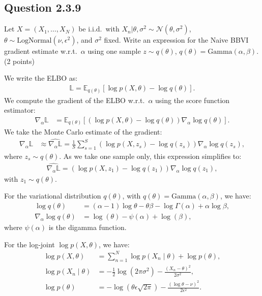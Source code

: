\documentclass{article}
\begin{document}
\begin{multicols}{2}
\subsection*{Question 2.3.9}
Let \(X = (X_1, \dots, X_N)\) be i.i.d.\ with \(X_n | \theta, \sigma^2 \sim \mathcal{N}(\theta, \sigma^2)\), \(\theta \sim \text{LogNormal}(\nu, \epsilon^2)\), and \(\sigma^2\) fixed. Write an expression for the Naive BBVI gradient estimate w.r.t.\ \(\alpha\) using one sample \(z \sim q(\theta)\), \(q(\theta) = \text{Gamma}(\alpha, \beta)\). (2 points)\bigskip 

We write the ELBO as:
\begin{align*}
    \mathbb{L} = \mathbb{E}_{q(\theta)}\left[\log p(X, \theta) - \log q(\theta)\right].
\end{align*}
We compute the gradient of the ELBO w.r.t.\ \(\alpha\) using the score function estimator:
\begin{align*}
    \nabla_\alpha \mathbb{L} &= \mathbb{E}_{q(\theta)}\left[(\log p(X, \theta) - \log q(\theta)) \nabla_\alpha \log q(\theta) \right].
\end{align*}
We take the Monte Carlo estimate of the gradient:
\begin{align*}
    \nabla_\alpha \mathbb{L} &\approx \widehat{\nabla_\alpha \mathbb{L}} = \frac{1}{S}\sum_{s=1}^{S}(\log p(X, z_s) - \log q(z_s)) \nabla_\alpha \log q(z_s),
\end{align*}
where \(z_s \sim q(\theta)\). As we take one sample only, this expression simplifies to:
\begin{align*}
    \widehat{\nabla_\alpha \mathbb{L}} = (\log p(X, z_1) - \log q(z_1)) \nabla_\alpha \log q(z_1),
\end{align*}
with \(z_1 \sim q(\theta)\).

For the variational distribution \(q(\theta)\), with \(q(\theta) = \text{Gamma}(\alpha, \beta)\), we have:
\begin{align*}
    \log q(\theta) &= (\alpha - 1)\log \theta - \theta \beta - \log \Gamma(\alpha) + \alpha \log \beta, \\
    \nabla_\alpha \log q(\theta) &= \log(\theta) - \psi(\alpha) + \log(\beta),
\end{align*}
where \(\psi(\alpha)\) is the digamma function.

For the log-joint \(\log p(X, \theta)\), we have:
\begin{align*}
    \log p(X, \theta) &= \sum_{n=1}^{N} \log p(X_n \mid \theta) + \log p(\theta), \\
    \log p(X_n \mid \theta) &= -\frac{1}{2} \log(2\pi\sigma^2) - \frac{(X_n - \theta)^2}{2\sigma^2}, \\
    \log p(\theta) &= -\log(\theta \epsilon \sqrt{2\pi}) - \frac{(\log \theta - \nu)^2}{2\epsilon^2}.
\end{align*}


\end{multicols}
\end{document}
